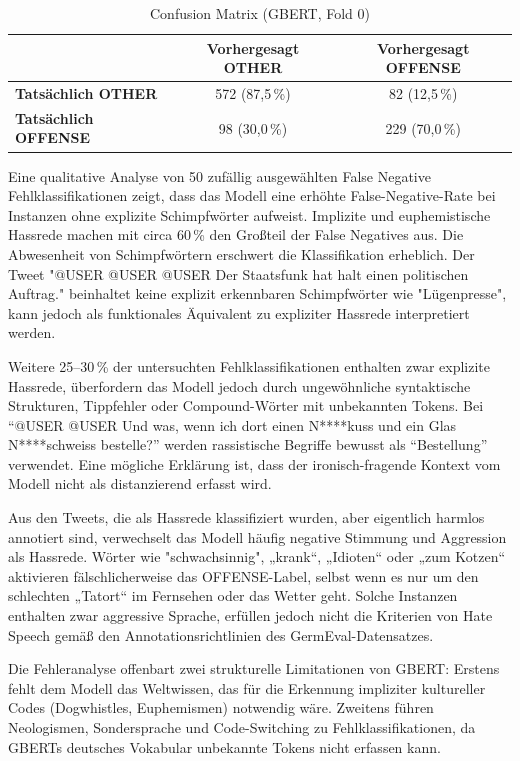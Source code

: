 ﻿\documentclass[11pt,a4paper]{article}
\begin{document}
\begin{table}[h]
\centering
\begin{tabular}{lcc}
\toprule
& \textbf{Vorhergesagt OTHER} & \textbf{Vorhergesagt OFFENSE} \\
\midrule
\textbf{Tatsächlich OTHER} & 572 (87,5\,\%) & 82 (12,5\,\%) \\
\textbf{Tatsächlich OFFENSE} & 98 (30,0\,\%) & 229 (70,0\,\%) \\
\bottomrule
\end{tabular}
\caption{Confusion Matrix (GBERT, Fold 0)}
\end{table}

Eine qualitative Analyse von 50 zufällig ausgewählten False Negative Fehlklassifikationen zeigt, dass das Modell eine erhöhte False-Negative-Rate bei Instanzen ohne explizite Schimpfwörter aufweist.
Implizite und euphemistische Hassrede machen mit circa 60\,\% den Großteil der False Negatives aus. Die Abwesenheit von Schimpfwörtern erschwert die Klassifikation erheblich. Der Tweet "@USER @USER @USER Der Staatsfunk hat halt einen politischen Auftrag." beinhaltet keine explizit erkennbaren Schimpfwörter wie "Lügenpresse", kann jedoch als funktionales Äquivalent zu expliziter Hassrede interpretiert werden.

Weitere 25–30\,\% der untersuchten Fehlklassifikationen enthalten zwar explizite Hassrede, überfordern das Modell jedoch durch ungewöhnliche syntaktische Strukturen, Tippfehler oder Compound-Wörter mit unbekannten Tokens. Bei \enquote{@USER @USER Und was, wenn ich dort einen N****kuss und ein Glas N****\-schweiss bestelle?} werden rassistische Begriffe bewusst als \enquote{Bestellung} verwendet. Eine mögliche Erklärung ist, dass der ironisch-fragende Kontext vom Modell nicht als distanzierend erfasst wird.

Aus den Tweets, die als Hassrede klassifiziert wurden, aber eigentlich harmlos annotiert sind, verwechselt das Modell häufig negative Stimmung und Aggression als Hassrede. Wörter wie "schwachsinnig", „krank“, „Idioten“ oder „zum Kotzen“ aktivieren fälschlicherweise das OFFENSE-Label, selbst wenn es nur um den schlechten „Tatort“ im Fernsehen oder das Wetter geht. Solche Instanzen enthalten zwar aggressive Sprache, erfüllen jedoch nicht die Kriterien von Hate Speech gemäß den Annotationsrichtlinien des GermEval-Datensatzes.

Die Fehleranalyse offenbart zwei strukturelle Limitationen von GBERT: Erstens fehlt dem Modell das Weltwissen, das für die Erkennung impliziter kultureller Codes (Dogwhistles, Euphemismen) notwendig wäre. Zweitens führen Neologismen, Sondersprache und Code-Switching zu Fehlklassifikationen, da GBERTs deutsches Vokabular unbekannte Tokens nicht erfassen kann.
\clearpage
\end{document}

